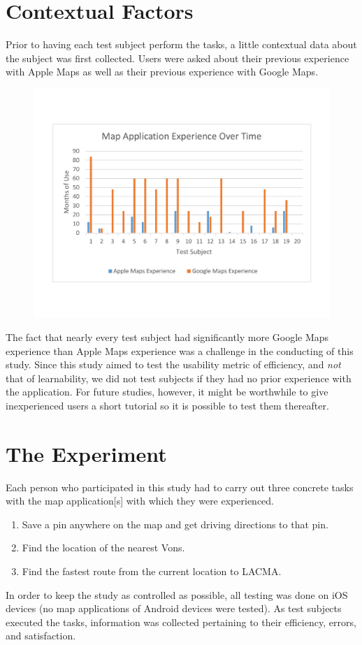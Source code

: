\documentclass[a4paper; 11pt]{article}
\begin{document}
\section{Contextual Factors}
Prior to having each test subject perform the tasks, a little contextual data about the subject was first collected. Users were asked about their previous experience with Apple Maps as well as their previous experience with Google Maps.
\vspace{-.2in}
\begin{figure}[ht]
\begin{center}
\includegraphics[keepaspectratio, width=.7\textwidth ]{user_context.pdf}
\end{center}
\end{figure}
\clearpage
\par
The fact that nearly every test subject had significantly more Google Maps experience than Apple Maps experience was a challenge in the conducting of this study.  Since this study aimed to test the usability metric of efficiency, and \textit{not} that of learnability, we did not test subjects if they had no prior experience with the application. For future studies, however, it might be worthwhile to give inexperienced users a short tutorial so it is possible to test them thereafter.



\section{The Experiment} \label{sec:Experiment}
Each person who participated in this study had to carry out three concrete tasks with the map application[s] with which they were experienced.
\begin{enumerate}
  \item Save a pin anywhere on the map and get driving directions to that pin.
  \item Find the location of the nearest Vons.
  \item Find the fastest route from the current location to LACMA.
\end{enumerate}
In order to keep the study as controlled as possible, all testing was done on iOS devices (no map applications of Android devices were tested). As test subjects executed the tasks, information was collected pertaining to their efficiency, errors, and satisfaction.
\end{document}
